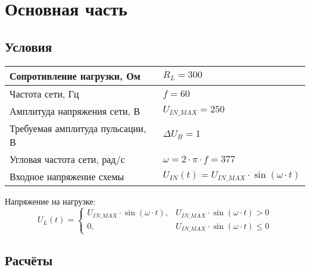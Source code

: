 \chapter{Основная часть}


\section{Условия}

\begin{table}[ht]
	\begin{tabular}{|l|l|}
		\hline
		Сопротивление нагрузки, Ом & $R_L=300$ \\ \hline
		Частота сети, Гц & $f=60$ \\ \hline
		Амплитуда напряжения сети, В & $U_{IN\_MAX}=250$ \\ \hline
		Требуемая амплитуда пульсации, В & $\Delta U_B=1$ \\ \hline
		Угловая частота сети, рад/с & $\omega=2\cdot \pi \cdot f = 377$\\ \hline
		Входное напряжение схемы & $U_{IN}(t)=U_{IN\_MAX} \cdot \sin(\omega \cdot t)$ \\ \hline
	\end{tabular}
\end{table}

Напряжение на нагрузке:
\begin{equation*}
	U_L(t) = 
	\begin{cases}
		U_{IN\_MAX} \cdot \sin(\omega \cdot t), &U_{IN\_MAX} \cdot \sin(\omega \cdot t) > 0\\
		0, &U_{IN\_MAX} \cdot \sin(\omega \cdot t) \le 0
	\end{cases}
\end{equation*}


\section{Расчёты}
